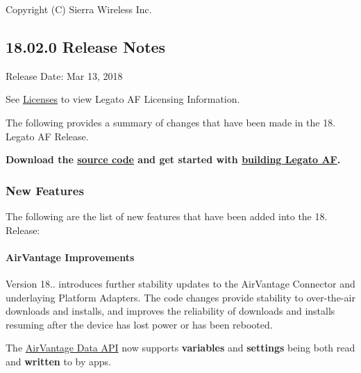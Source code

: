 Copyright (C) Sierra Wireless Inc. \hypertarget{releaseNotes18020}{}\subsection{18.02.0 Release Notes}\label{releaseNotes18020}
Release Date\+: Mar 13, 2018

See \hyperlink{aboutLicenses}{Licenses} to view Legato AF Licensing Information.

The following provides a summary of changes that have been made in the 18. Legato AF Release.

{\bfseries  Download the \hyperlink{aboutReleaseInfo}{source code} and get started with \hyperlink{basicBuild}{building Legato AF}. }\hypertarget{releaseNotes18020_rn1802_Features}{}\subsubsection{New Features}\label{releaseNotes18020_rn1802_Features}
The following are the list of new features that have been added into the 18. Release\+:\hypertarget{releaseNotes18020_rn1802_Features_AV}{}\paragraph{Air\+Vantage Improvements}\label{releaseNotes18020_rn1802_Features_AV}
Version 18.. introduces further stability updates to the Air\+Vantage Connector and underlaying Platform Adapters. The code changes provide stability to over-\/the-\/air downloads and installs, and improves the reliability of downloads and installs resuming after the device has lost power or has been rebooted.

The \hyperlink{c_le_avdata_le_avdata_overview}{Air\+Vantage Data A\+PI} now supports {\bfseries variables} and {\bfseries settings} being both read and {\bfseries written} to by apps.

